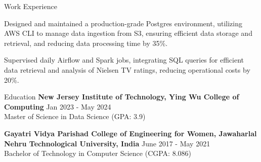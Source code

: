 \documentclass{resume} %
\begin{document}
\begin{rSection}{Work Experience}
\begin{rSubsection}
                                    \item Designed and maintained a production{-}grade Postgres environment, utilizing AWS CLI to manage data ingestion from S3, ensuring efficient data storage and retrieval, and reducing data processing time by 35\%.
                                    \item Supervised daily Airflow and Spark jobs, integrating SQL queries for efficient data retrieval and analysis of Nielsen TV ratings, reducing operational costs by 20\%.
                            \end{rSubsection}
            \end{rSection}

\begin{rSection}{Education}
                        \textbf{New Jersey Institute of Technology, Ying Wu College of Computing} \hfill {Jan 2023 - May 2024} \\
                            {Master of Science in Data Science (GPA: 3.9)}
                         
             
         
                        \textbf{Gayatri Vidya Parishad College of Engineering for Women, Jawaharlal Nehru Technological University, India} \hfill {June 2017 - May 2021} \\
                            {Bachelor of Technology in Computer Science (CGPA: 8.086)}
                         
             
         
    \end{rSection}
\end{document}
